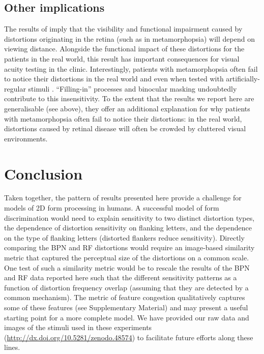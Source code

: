 \documentclass[doc, 11pt,a4paper,natbib]{apa6}\usepackage[]{graphicx}\usepackage[]{color}
\begin{document}
\subsection{Other implications}
The results of \citet{wiecek_metamorphopsia_2014} imply that the visibility and functional impairment caused by distortions originating in the retina (such as in metamorphopsia) will depend on viewing distance.
Alongside the functional impact of these distortions for the patients in the real world, this result has important consequences for visual acuity testing in the clinic.
Interestingly, patients with metamorphopsia often fail to notice their distortions in the real world \citep{wiecek_metamorphopsia_2015} and even when tested with artificially-regular stimuli \citep{crossland_amsler_2007,schuchard_validity_1993,wiecek_metamorphopsia_2015}.
``Filling-in'' processes \citep{crossland_amsler_2007} and binocular masking \citep{wiecek_metamorphopsia_2015} undoubtedly contribute to this insensitivity.
To the extent that the results we report here are generalisable (see above), they \citep[along with][]{bex_sensitivity_2010} offer an additional explanation for why patients with metamorphopsia often fail to notice their distortions: in the real world, distortions caused by retinal disease will often be crowded by cluttered visual environments.


\section{Conclusion}

Taken together, the pattern of results presented here provide a challenge for models of 2D form processing in humans.
A successful model of form discrimination would need to explain sensitivity to two distinct distortion types, the dependence of distortion sensitivity on flanking letters, and the dependence on the type of flanking letters (distorted flankers reduce sensitivity).
Directly comparing the BPN and RF distortions would require an image-based similarity metric that captured the perceptual size of the distortions on a common scale.
One test of such a similarity metric would be to rescale the results of the BPN and RF data reported here such that the different sensitivity patterns as a function of distortion frequency overlap (assuming that they are detected by a common mechanism).
The metric of feature congestion \citep{rosenholtz_measuring_2007} qualitatively captures some of these features (see Supplementary Material) and may present a useful starting point for a more complete model.
We have provided our raw data and images of the stimuli used in these experiments (\url{http://dx.doi.org/10.5281/zenodo.48574}) to facilitate future efforts along these lines.
\end{document}
